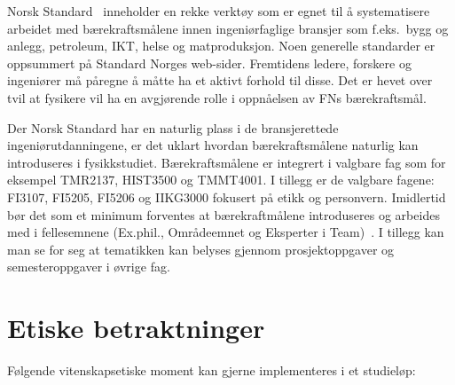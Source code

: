 \documentclass{article}
\begin{document}
Norsk Standard~\cite{StandardNorge} inneholder en rekke verktøy som er egnet til å systematisere arbeidet med bærekraftsmålene innen ingeniørfaglige bransjer som f.eks.~bygg og anlegg, petroleum, IKT, helse og matproduksjon.
Noen generelle standarder er oppsummert på Standard Norges web-sider.
Fremtidens ledere, forskere og ingeniører må påregne å måtte ha et aktivt forhold til disse.
Det er hevet over tvil at fysikere vil ha en avgjørende rolle i oppnåelsen av FNs bærekraftsmål.

Der Norsk Standard har en naturlig plass i de bransjerettede ingeniørutdanningene, er det uklart hvordan bærekraftsmålene naturlig kan introduseres i fysikkstudiet. Bærekraftsmålene er integrert i valgbare fag som for eksempel TMR2137, HIST3500 og TMMT4001. I tillegg er de valgbare fagene: FI3107, FI5205, FI5206 og IIKG3000 fokusert på etikk og personvern. Imidlertid bør det som et minimum forventes at bærekraftmålene introduseres og arbeides med i fellesemnene (Ex.phil., Områdeemnet og Eksperter i Team)~\cite{NTNUFellesEmner}.
I tillegg kan man se for seg at tematikken kan belyses gjennom prosjektoppgaver og semesteroppgaver i øvrige fag.

\section{Etiske betraktninger}
Følgende vitenskapsetiske moment kan gjerne implementeres i et studieløp:
\end{document}
